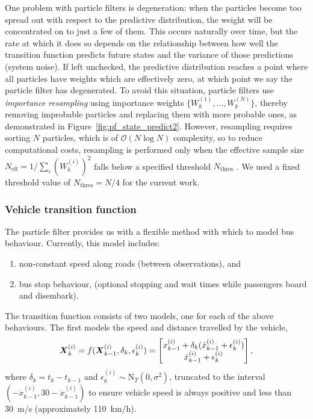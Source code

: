 One problem with particle filters is degeneration:
when the particles become too spread out with respect to the predictive distribution,
the weight will be concentrated on to just a few of them.
This occurs naturally over time, but the rate at which it does so depends
on the relationship between how well the transition function predicts future states
and the variance of those predictions (system noise).
If left unchecked, the predictive distribution reaches a point
where all particles have weights which are effectively zero,
at which point we say the particle filter has degenerated.
To avoid this situation,
particle filters use \emph{importance resampling}
using importance weights $\{W_k^{(1)}, \ldots, W_k^{(N)}\}$,
thereby removing improbable particles and replacing them with more probable ones,
as demonstrated in Figure~\ref{fig:pf_state_predict2}.
However, resampling requires sorting $N$ particles,
which is of $\mathcal{O}(N\log N)$ complexity,
so to reduce computational costs, resampling is performed only when
the effective sample size $N_{\text{eff}} = 1 / \sum_i (W_k^{(i)})^2$
falls below a specified threshold $N_{\text{thres}}$
\citep{Gustafsson_2002}.
We used a fixed threshold value of $N_{\text{thres}} = N/4$
for the current work.


\subsubsection{Vehicle transition function}
\label{sec:pf_prediction}

The particle filter provides us with a flexible method
with which to model bus behaviour.
Currently, this model includes:
\begin{enumerate}
\item non-constant speed along roads (between observations), and
\item bus stop behaviour, (optional stopping and wait times while passengers board and disembark).
\end{enumerate}
The transition function consists of two models,
one for each of the above behaviours.
The first models the speed and distance travelled by the vehicle,
\begin{equation}
\label{eq:trans_newton}
\mbox{$\boldsymbol{X}$}_k^{(i)} = f(\mbox{$\boldsymbol{X}$}_{k-1}^{(i)}, \delta_k, \epsilon_k^{(i)}) =
    \begin{bmatrix}
        x_{k-1}^{(i)} + \delta_k(\dot x_{k-1}^{(i)} + \epsilon_k^{(i)}) \\
        \dot x_{k-1}^{(i)} + \epsilon_k^{(i)}
    \end{bmatrix},
\end{equation}
where $\delta_k = t_k - t_{k-1}$
and $\epsilon_k^{(i)}\sim\mathrm{N}_T(0, \sigma^2)$, truncated to the interval
$(-\dot x_{k-1}^{(i)}, 30 - \dot x_{k-1}^{(i)})$
to ensure vehicle speed is always positive and less than 30~m/s
(approximately 110~km/h).


